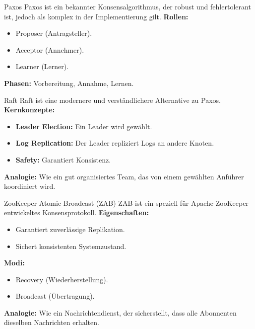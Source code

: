 \documentclass{beamer}
\begin{document}
\begin{frame}{Paxos}
    Paxos ist ein bekannter Konsensalgorithmus, der robust und fehlertolerant ist, jedoch als komplex in der Implementierung gilt. \newline
    \textbf{Rollen:}
    \begin{itemize}
        \item Proposer (Antragsteller).
        \item Acceptor (Annehmer).
        \item Learner (Lerner).
    \end{itemize}
    \textbf{Phasen:} Vorbereitung, Annahme, Lernen.
\end{frame}

\begin{frame}{Raft}
    Raft ist eine modernere und verständlichere Alternative zu Paxos. \newline
    \textbf{Kernkonzepte:}
    \begin{itemize}
        \item \textbf{Leader Election:} Ein Leader wird gewählt.
        \item \textbf{Log Replication:} Der Leader repliziert Logs an andere Knoten.
        \item \textbf{Safety:} Garantiert Konsistenz.
    \end{itemize}
    \textbf{Analogie:} Wie ein gut organisiertes Team, das von einem gewählten Anführer koordiniert wird.
\end{frame}

\begin{frame}{ZooKeeper Atomic Broadcast (ZAB)}
    ZAB ist ein speziell für Apache ZooKeeper entwickeltes Konsensprotokoll. \newline
    \textbf{Eigenschaften:}
    \begin{itemize}
        \item Garantiert zuverlässige Replikation.
        \item Sichert konsistenten Systemzustand.
    \end{itemize}
    \textbf{Modi:}
    \begin{itemize}
        \item Recovery (Wiederherstellung).
        \item Broadcast (Übertragung).
    \end{itemize}
    \textbf{Analogie:} Wie ein Nachrichtendienst, der sicherstellt, dass alle Abonnenten dieselben Nachrichten erhalten.
\end{frame}
\end{document}
